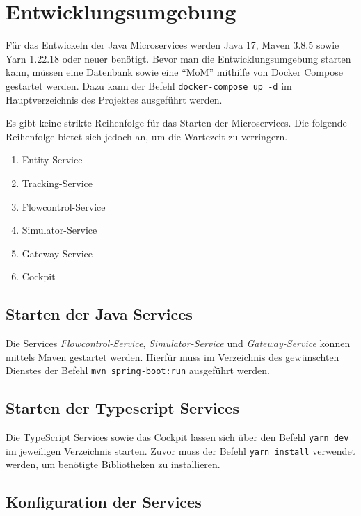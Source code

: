 \section{Entwicklungsumgebung}

Für das Entwickeln der Java Microservices werden Java 17, Maven 3.8.5 sowie Yarn 1.22.18 oder neuer benötigt.
Bevor man die Entwicklungsumgebung starten kann, müssen eine Datenbank sowie eine \enquote{MoM} mithilfe von Docker Compose gestartet werden.
Dazu kann der Befehl \verb|docker-compose up -d| im Hauptverzeichnis des Projektes ausgeführt werden.

Es gibt keine strikte Reihenfolge für das Starten der Microservices.
Die folgende Reihenfolge bietet sich jedoch an, um die Wartezeit zu verringern. 

\begin{enumerate}
	\item Entity-Service
	\item Tracking-Service
	\item Flowcontrol-Service
	\item Simulator-Service
	\item Gateway-Service
	\item Cockpit
\end{enumerate}

\subsection{Starten der Java Services}

Die Services \textit{Flowcontrol-Service}, \textit{Simulator-Service} und \textit{Gateway-Service} können mittels Maven gestartet werden.
Hierfür muss im Verzeichnis des gewünschten Dienstes der Befehl \verb|mvn spring-boot:run| ausgeführt werden.

\subsection{Starten der Typescript Services}

Die TypeScript Services sowie das Cockpit lassen sich über den Befehl \verb|yarn dev| im jeweiligen Verzeichnis starten.
Zuvor muss der Befehl \verb|yarn install| verwendet werden, um benötigte Bibliotheken zu installieren. 


\subsection{Konfiguration der Services}

